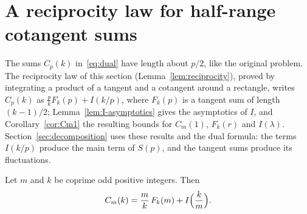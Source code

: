 \section{A reciprocity law for half-range cotangent sums}\label{sec:reciprocity}

The sums $C_p(k)$ in~\eqref{eq:dual} have length about $p/2$, like the original problem. The reciprocity law of this section (Lemma~\ref{lem:reciprocity}), proved by integrating a product of a tangent and a cotangent around a rectangle, writes $C_p(k)$ as $\frac pkF_k(p)+I(k/p)$, where $F_k(p)$ is a tangent sum of length $(k-1)/2$; Lemma~\ref{lem:I-asymptotics} gives the asymptotics of $I$, and Corollary~\ref{cor:Cm1} the resulting bounds for $C_m(1)$, $F_k(r)$ and $I(\lambda)$. Section~\ref{sec:decomposition} uses these results and the dual formula: the terms $I(k/p)$ produce the main term of $S(p)$, and the tangent sums produce its fluctuations.

\begin{lemma}[Reciprocity]\label{lem:reciprocity}
Let $m$ and $k$ be coprime odd positive integers. Then
\[
C_m(k)=\frac mk\,F_k(m)+I\Bigl(\frac km\Bigr).
\]
\end{lemma}

